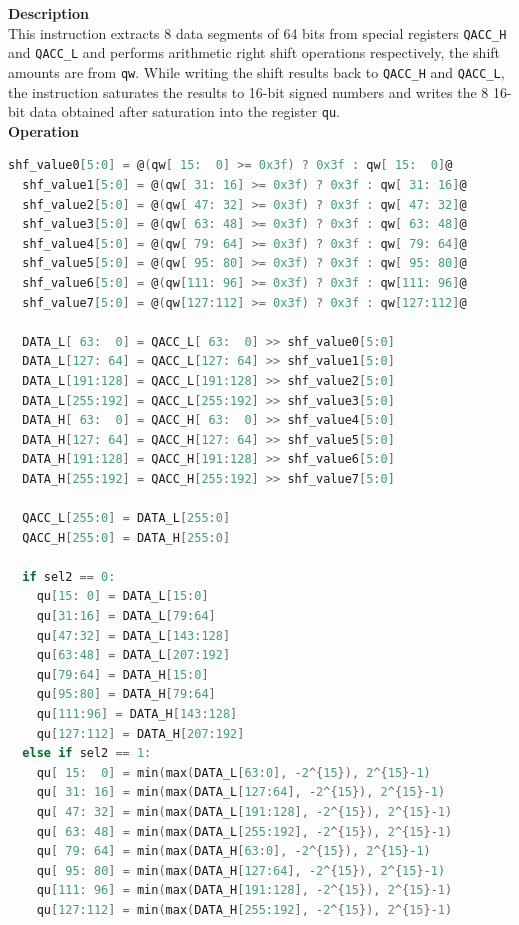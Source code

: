 \textbf{Description}\\
This instruction extracts 8 data segments of 64 bits from special registers \lstinline{QACC_H} and \lstinline{QACC_L} and performs arithmetic right shift operations respectively, the shift amounts are from \lstinline{qw}. While writing the shift results back to \lstinline{QACC_H} and \lstinline{QACC_L}, the instruction saturates the results to 16-bit signed numbers and writes the 8 16-bit data obtained after saturation into the register \lstinline{qu}.\\
\textbf{Operation}
\begin{lstlisting}[language=C, escapechar=@]
  shf_value0[5:0] = @(qw[ 15:  0] >= 0x3f) ? 0x3f : qw[ 15:  0]@
  shf_value1[5:0] = @(qw[ 31: 16] >= 0x3f) ? 0x3f : qw[ 31: 16]@
  shf_value2[5:0] = @(qw[ 47: 32] >= 0x3f) ? 0x3f : qw[ 47: 32]@
  shf_value3[5:0] = @(qw[ 63: 48] >= 0x3f) ? 0x3f : qw[ 63: 48]@
  shf_value4[5:0] = @(qw[ 79: 64] >= 0x3f) ? 0x3f : qw[ 79: 64]@
  shf_value5[5:0] = @(qw[ 95: 80] >= 0x3f) ? 0x3f : qw[ 95: 80]@
  shf_value6[5:0] = @(qw[111: 96] >= 0x3f) ? 0x3f : qw[111: 96]@
  shf_value7[5:0] = @(qw[127:112] >= 0x3f) ? 0x3f : qw[127:112]@

  DATA_L[ 63:  0] = QACC_L[ 63:  0] >> shf_value0[5:0]
  DATA_L[127: 64] = QACC_L[127: 64] >> shf_value1[5:0]
  DATA_L[191:128] = QACC_L[191:128] >> shf_value2[5:0]
  DATA_L[255:192] = QACC_L[255:192] >> shf_value3[5:0]
  DATA_H[ 63:  0] = QACC_H[ 63:  0] >> shf_value4[5:0]
  DATA_H[127: 64] = QACC_H[127: 64] >> shf_value5[5:0]
  DATA_H[191:128] = QACC_H[191:128] >> shf_value6[5:0]
  DATA_H[255:192] = QACC_H[255:192] >> shf_value7[5:0]

  QACC_L[255:0] = DATA_L[255:0]
  QACC_H[255:0] = DATA_H[255:0]

  if sel2 == 0:
    qu[15: 0] = DATA_L[15:0]
    qu[31:16] = DATA_L[79:64]
    qu[47:32] = DATA_L[143:128]
    qu[63:48] = DATA_L[207:192]
    qu[79:64] = DATA_H[15:0]
    qu[95:80] = DATA_H[79:64]
    qu[111:96] = DATA_H[143:128]
    qu[127:112] = DATA_H[207:192]
  else if sel2 == 1:
    qu[ 15:  0] = min(max(DATA_L[63:0], -2^{15}), 2^{15}-1)
    qu[ 31: 16] = min(max(DATA_L[127:64], -2^{15}), 2^{15}-1)
    qu[ 47: 32] = min(max(DATA_L[191:128], -2^{15}), 2^{15}-1)
    qu[ 63: 48] = min(max(DATA_L[255:192], -2^{15}), 2^{15}-1)
    qu[ 79: 64] = min(max(DATA_H[63:0], -2^{15}), 2^{15}-1)
    qu[ 95: 80] = min(max(DATA_H[127:64], -2^{15}), 2^{15}-1)
    qu[111: 96] = min(max(DATA_H[191:128], -2^{15}), 2^{15}-1)
    qu[127:112] = min(max(DATA_H[255:192], -2^{15}), 2^{15}-1)
\end{lstlisting}

